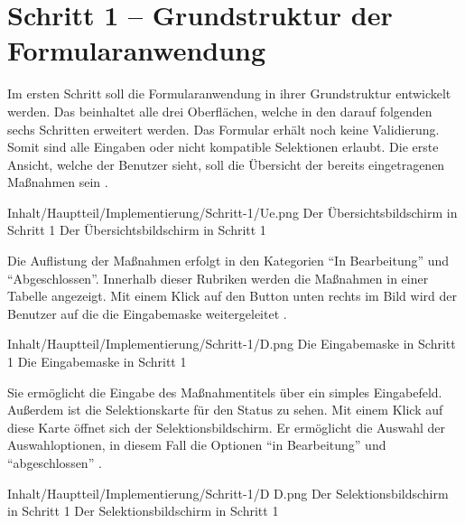 \chapter{Schritt 1 -- Grundstruktur der Formularanwendung}
\label{chap:Schritt-1}

Im ersten Schritt soll die Formularanwendung in ihrer Grundstruktur entwickelt werden.
 Das beinhaltet alle drei Oberflächen, welche in den darauf folgenden sechs Schritten erweitert werden.
 Das Formular erhält noch keine  Validierung.
 Somit sind alle Eingaben oder nicht kompatible Selektionen erlaubt.
 Die erste Ansicht, welche der Benutzer sieht, soll die Übersicht der bereits eingetragenen Maßnahmen sein \Abb{\ref{fig:Schritt1Uebersicht}}.
 
\begin{alexfigure}{Inhalt/Hauptteil/Implementierung/Schritt-1/Ue.png}
  {Der Übersichtsbildschirm in Schritt 1}
  {Der Übersichtsbildschirm in Schritt 1}

  \label{fig:Schritt1Uebersicht}

\end{alexfigure}

Die Auflistung der Maßnahmen erfolgt in den Kategorien \enquote{In Bearbeitung} und \enquote{Abgeschlossen}.
Innerhalb dieser Rubriken werden die Maßnahmen in einer Tabelle angezeigt.
Mit einem Klick auf den Button unten rechts im Bild wird der Benutzer auf die die Eingabemaske weitergeleitet \Abb{\ref{fig:Schritt1Eingabemaske}}.

\begin{alexfigure}{Inhalt/Hauptteil/Implementierung/Schritt-1/D.png}
  {Die Eingabemaske in Schritt 1}
  {Die Eingabemaske in Schritt 1}

  \label{fig:Schritt1Eingabemaske}

\end{alexfigure}

Sie ermöglicht die Eingabe des Maßnahmentitels über ein simples Eingabefeld.
Außerdem ist die Selektionskarte für den Status zu sehen.
Mit einem Klick auf diese Karte öffnet sich der Selektionsbildschirm.
Er ermöglicht die Auswahl der Auswahloptionen, in diesem Fall die Optionen \enquote{in Bearbeitung} und \enquote{abgeschlossen}
\Abb{\ref{fig:Schritt1SelektionsBildschirmStatus}}.

\begin{alexfigure}{Inhalt/Hauptteil/Implementierung/Schritt-1/D D.png}
  {Der Selektionsbildschirm in Schritt 1}
  {Der Selektionsbildschirm in Schritt 1}

  \label{fig:Schritt1SelektionsBildschirmStatus}

\end{alexfigure}

